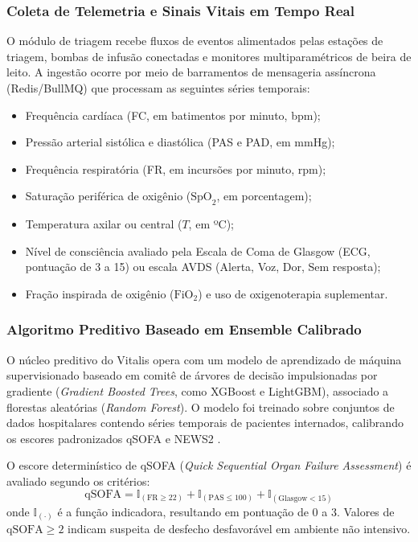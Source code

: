 \subsubsection{Coleta de Telemetria e Sinais Vitais em Tempo Real}
O módulo de triagem recebe fluxos de eventos alimentados pelas estações de triagem, bombas de infusão conectadas e monitores multiparamétricos de beira de leito. A ingestão ocorre por meio de barramentos de mensageria assíncrona (Redis/BullMQ) que processam as seguintes séries temporais:
\begin{itemize}[noitemsep]
    \item Frequência cardíaca (FC, em batimentos por minuto, bpm);
    \item Pressão arterial sistólica e diastólica (PAS e PAD, em mmHg);
    \item Frequência respiratória (FR, em incursões por minuto, rpm);
    \item Saturação periférica de oxigênio ($\text{SpO}_2$, em porcentagem);
    \item Temperatura axilar ou central ($T$, em ºC);
    \item Nível de consciência avaliado pela Escala de Coma de Glasgow (ECG, pontuação de 3 a 15) ou escala AVDS (Alerta, Voz, Dor, Sem resposta);
    \item Fração inspirada de oxigênio ($\text{FiO}_2$) e uso de oxigenoterapia suplementar.
\end{itemize}

\subsubsection{Algoritmo Preditivo Baseado em Ensemble Calibrado}
O núcleo preditivo do Vitalis opera com um modelo de aprendizado de máquina supervisionado baseado em comitê de árvores de decisão impulsionadas por gradiente (\textit{Gradient Boosted Trees}, como XGBoost e LightGBM), associado a florestas aleatórias (\textit{Random Forest}). O modelo foi treinado sobre conjuntos de dados hospitalares contendo séries temporais de pacientes internados, calibrando os escores padronizados qSOFA \cite{singer_sepsis:2016} e NEWS2 \cite{rcp_news2:2017}.

O escore determinístico de qSOFA (\textit{Quick Sequential Organ Failure Assessment}) é avaliado segundo os critérios:
\begin{equation}
    \text{qSOFA} = \mathbb{I}_{(\text{FR} \ge 22)} + \mathbb{I}_{(\text{PAS} \le 100)} + \mathbb{I}_{(\text{Glasgow} < 15)}
\end{equation}
onde $\mathbb{I}_{(\cdot)}$ é a função indicadora, resultando em pontuação de 0 a 3. Valores de $\text{qSOFA} \ge 2$ indicam suspeita de desfecho desfavorável em ambiente não intensivo.


